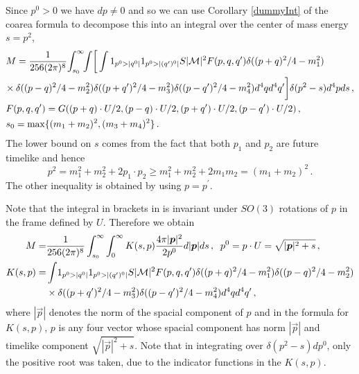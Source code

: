 Since $p^0>0$ we have $dp\neq 0$ and so we can use Corollary \ref{dummyInt} of the coarea formula to decompose this into an integral over the center of mass energy $s=p^2$,
\begin{align}\label{Meq2}
&M=\frac{1}{256(2\pi)^8 }\!\int_{s_0}^\infty\!\!\int \!\bigg[\int 1_{p^0>|q^0|} 1_{p^0>|(q^{\prime})^0|}  S |\mathcal{M}|^2  F(p,q,q^{\prime}) \delta((p+q)^2/4-m_1^2)\\
&\!\times\delta((p-q)^2/4-m_2^2)\delta((p+q^{\prime})^2/4-m_3^2)\delta((p-q^{\prime})^2/4-m_4^2)d^4qd^4q^{\prime}\bigg]\delta(p^2-s) d^4pds\,,\notag\\
&F(p,q,q^{\prime})=G((p+q)\cdot U/2,(p-q)\cdot  U/2,(p+q^{\prime})\cdot U/2, (p-q^{\prime})\cdot U/2)\,,\notag\\
&s_0=\max\{(m_1+m_2)^2,(m_3+m_4)^2\}\,.\notag
\end{align}
The lower bound on $s$ comes from the fact that both $p_1$ and $p_2$ are future timelike and hence 
\begin{equation}
p^2=m_1^2+m_2^2+2p_1\cdot p_2\geq m_1^2+m_2^2+2m_1m_2=(m_1+m_2)^2\,.
\end{equation}
The other inequality is obtained by using $p=p^{\prime}$. 

Note that the integral in brackets in  is invariant under $SO(3)$ rotations of $p$ in the frame defined by $U$.  Therefore we obtain
\begin{align}\label{Kdef}
M=&\frac{1}{256(2\pi)^8 }\int_{s_0}^\infty\int_0^\infty K(s,p)\frac{4\pi |\vec p|^2}{2p^0}d|\vec p|ds\,,\hspace{2mm} p^0=p\cdot U=\sqrt{|\vec p|^2+s}\,,\\
K(s,p)=&\int\! 1_{p^0>|q^0|} 1_{p^0>|(q^{\prime})^0|}  S |\mathcal{M}|^2  F(p,q,q^{\prime}) \delta((p+q)^2/4-m_1^2)\delta((p-q)^2/4-m_2^2)\notag\\
&\times\delta((p+q^{\prime})^2/4-m_3^2)\delta((p-q^{\prime})^2/4-m_4^2)d^4qd^4q^{\prime}\,,\notag
\end{align}
where $|\vec p|$ denotes the norm of the spacial component of $p$ and in the formula for $K(s,p)$, $p$ is any four vector whose spacial component has norm $|\vec p|$ and timelike component $\sqrt{|\vec p|^2+s}$. Note that in integrating over $\delta(p^2-s)dp^0$, only the positive root was taken, due to the indicator functions in the $K(s,p)$.

